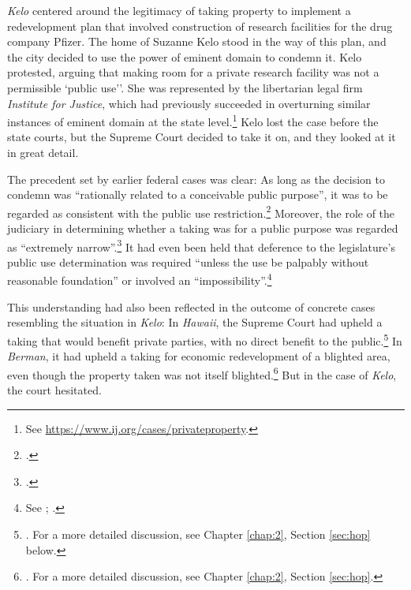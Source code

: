 \documentclass[12pt,a4paper]{book} %
\begin{document}
{\it Kelo} centered around the legitimacy of taking property to implement a redevelopment plan that involved construction of research facilities for the drug company Pfizer. The home of Suzanne Kelo stood in the way of this plan, and the city decided to use the power of eminent domain to condemn it. Kelo protested, arguing that making room for a private research facility was not a permissible  `public use''. She was represented by the libertarian legal firm {\it Institute for Justice}, which had previously succeeded in overturning similar instances of eminent domain at the state level.\footnote{See \url{https://www.ij.org/cases/privateproperty}.} Kelo lost the case before the state courts, but the Supreme Court decided to take it on, and they looked at it in great detail.

The precedent set by earlier federal cases was clear: As long as the decision to condemn was ``rationally related to a conceivable public purpose'', it was to be regarded as consistent with the public use restriction.\footcite[241]{midkiff84} Moreover, the role of the judiciary in determining whether a taking was for a public purpose was regarded as ``extremely narrow''.\footcite[32]{berman54} It had even been held that deference to the legislature's public use determination was required ``unless the use be palpably without reasonable foundation'' or involved an ``impossibility''.\footnote{See \cite[66]{dominion25}; \cite[680]{gettysburg96}.}

This understanding had also been reflected in the outcome of concrete cases resembling the situation in {\it Kelo}: In {\it Hawaii}, the Supreme Court had upheld a taking that would benefit private parties, with no direct benefit to the public.\footnote{\cite{midkiff84}. For a more detailed discussion, see Chapter \ref{chap:2}, Section \ref{sec:hop} below.} In {\it Berman}, it had upheld a taking for economic redevelopment of a blighted area, even though the property taken was not itself blighted.\footnote{\cite{berman54}. For a more detailed discussion, see Chapter \ref{chap:2}, Section \ref{sec:hop}.} But in the case of {\it Kelo}, the court hesitated.
\end{document}
